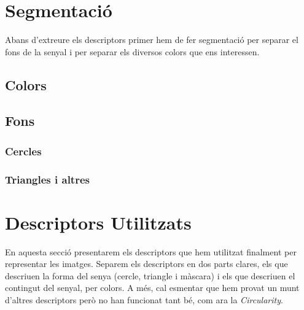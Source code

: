 
%



\section{Segmentació}%
\label{sec:segmentacio}

Abans d'extreure els descriptors primer hem de fer segmentació per separar el fons de la
senyal i per separar els diversos colors que ens interessen.

\subsection{Colors}

\subsection{Fons}%
\label{sub:seg_fons}

\subsubsection{Cercles}


\subsubsection{Triangles i altres}



\section{Descriptors Utilitzats}%
\label{sec:desc}

En aquesta secció presentarem els descriptors que hem utilitzat finalment per
representar les imatges. Separem els descriptors en dos parts clares, els que descriuen
la forma del senya (cercle, triangle i màscara) i els que descriuen el contingut del
senyal, per colors.
A més, cal esmentar que hem provat un
munt d'altres descriptors però no han funcionat tant bé, com ara la \emph{Circularity}.

